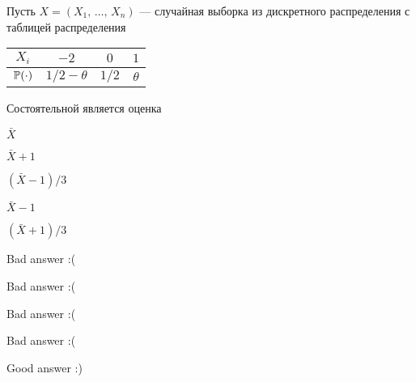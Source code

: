 
\begin{question}
Пусть \(X = (X_1, \, \ldots, \, X_n)\) — случайная выборка из
дискретного распределения с таблицей распределения

\vspace{5mm}
\begin{tabular}{cccc}
\toprule
$X_i$    & $-2$     & $0$   & $1$  \\
\midrule
$\P(\cdot)$        & $1/2 - \theta$      & $1/2$    & $\theta$  \\
\bottomrule
\end{tabular}
\vspace{5mm}

Состоятельной является оценка
\begin{answerlist}
  \item \(\bar{X}\)
  \item \(\bar{X} + 1\)
  \item \((\bar{X} - 1) / 3\)
  \item \(\bar{X} - 1\)
  \item \((\bar{X} + 1) / 3\)
\end{answerlist}
\end{question}

\begin{solution}
\begin{answerlist}
  \item Bad answer :(
  \item Bad answer :(
  \item Bad answer :(
  \item Bad answer :(
  \item Good answer :)
\end{answerlist}
\end{solution}

